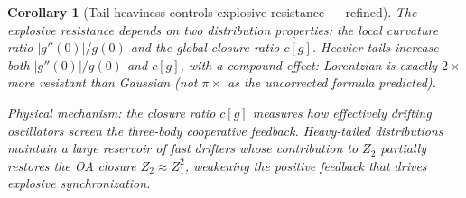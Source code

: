 \documentclass[11pt]{article}
\newtheorem{corollary}{Corollary}
\begin{document}
\begin{corollary}[Tail heaviness controls explosive resistance --- refined]
  The explosive resistance depends on \emph{two} distribution properties:
  the local curvature ratio $|g''(0)|/g(0)$ \emph{and} the global closure
  ratio $c[g]$. Heavier tails increase both $|g''(0)|/g(0)$ and $c[g]$,
  with a compound effect: Lorentzian is exactly $2\times$ more resistant
  than Gaussian (not $\pi\times$ as the uncorrected formula predicted).

  Physical mechanism: the closure ratio $c[g]$ measures how effectively
  drifting oscillators screen the three-body cooperative feedback.
  Heavy-tailed distributions maintain a large reservoir of fast drifters
  whose contribution to $Z_2$ partially restores the OA closure
  $Z_2 \approx Z_1^2$, weakening the positive feedback that drives
  explosive synchronization.
\end{corollary}
\end{document}
